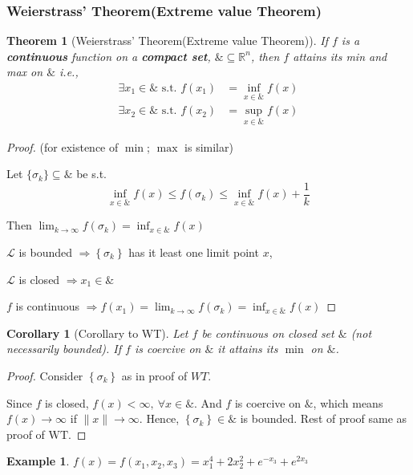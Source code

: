 \documentclass[11pt,a4paper]{article}
\newtheorem{theorem}{Theorem}
\newtheorem{example}{Example}
\newtheorem{corollary}{Corollary}
\begin{document}
\subsubsection{Weierstrass' Theorem(Extreme value Theorem)}
\begin{theorem}
    [Weierstrass' Theorem(Extreme value Theorem)]
    \quad

    If $f$ is a \textbf{continuous} function on a \textbf{compact set}, $\& \subseteq \mathbb{R}^{n}$, then $f$ attains its min and max on $\&$ i.e.,
    $$
    \begin{aligned}
    \exists x_1 \in \& \text { s.t. } f\left(x_{1}\right) &=\inf _{x \in \&} f(x) \\
    \exists x_{2} \in \& \text { s.t. } f\left(x_{2}\right) &=\sup _{x \in \&} f(x)
    \end{aligned}
    $$
\end{theorem}
\begin{proof}
    (for existence of $\min$; $\max$ is similar)

    Let $\{\sigma_k\}\subseteq \&$ be s.t.
    $$\inf_{x\in\&} f(x) \leq f\left(\sigma_{k}\right) \leq \inf _{x \in \&} f(x)+\frac{1}{k}$$

    Then $\lim _{k \rightarrow \infty} f\left(\sigma_{k}\right)=\inf_{x\in\&} f(x)$

    $\mathcal{L}$ is bounded $\Rightarrow\left\{\sigma_{k}\right\}$ has it least one limit point $x$,

    $\mathcal{L}$ is closed $\Rightarrow x_{1} \in \&$

    $f$ is continuous $\Rightarrow f\left(x_{1}\right)=\lim _{k \rightarrow \infty} f\left(\sigma_{k}\right)=\inf _{x \in \&} f(x)$
\end{proof}

\begin{corollary}[Corollary to WT]
    Let $f$ be continuous on closed set $\&$ (not necessarily bounded). If $f$ is coercive on $\&$ it attains its $\min$ on $\&$.
\end{corollary}
\begin{proof}
    Consider $\left\{\sigma_{k}\right\}$ as in proof of $WT$.

    Since $f$ is closed, $f(x)<\infty,\ \forall x\in\&$. And $f$ is coercive on $\&$, which means $f(x)\rightarrow \infty$ if $\|x\| \rightarrow\infty$. Hence, $\left\{\sigma_{k}\right\}\in\&$ is bounded. Rest of proof same as proof of $\mathrm{WT}$.
\end{proof}

\begin{example}
    $f(x)=f\left(x_{1}, x_{2}, x_{3}\right)=x_{1}^{4}+2 x_{2}^{2}+e^{-x_{3}}+e^{2 x_{3}}$
\end{example}
\end{document}
